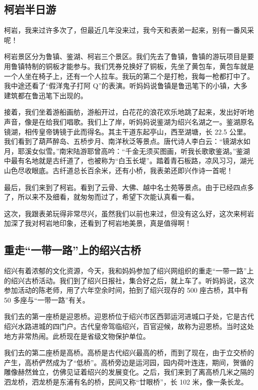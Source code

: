 \documentclass[UTF8,a4paper,titlepage,twoside,10.5pt]{article}
\begin{document}
\subsection{柯岩半日游}
\label{sec:org1535df1}

柯岩，我来过许多次了，但最近几年没来过，我今天和表弟一起来，别有一番风采呢！

柯岩景区分为鲁镇、鉴湖、柯岩三个景区。我们先去了鲁镇，鲁镇的游玩项目是要用鲁镇特制的铜板才能参与。我们凭券兑换好了铜板，先坐了黄包车，黄包车就是一个人坐在椅子上，还有一个人拉车。我玩的第二个是打枪，我每一枪都打中了。我中途还看了“假洋鬼子打阿 Q”的表演。听妈妈说鲁镇是鲁迅笔下的小镇，大多建筑都在鲁迅笔下出现的。

接着，我们坐着游船画舫，游船开过，白花花的浪花欢乐地跳了起来，发出好听地声音，像是在给我们唱歌。我们上了岸，听妈妈说鉴湖为绍兴名湖之一。鉴湖原名镜湖，相传皇帝铸镜于此而得名。其主干道东起亭山，西至湖塘，长 22.5 公里。我们看到了葫芦醉岛、五桥步月、南洋秋泛等景点。唐代诗人李白云：“镜湖水如月，耶溪女似雪。”南宋陆游耶曾高吟：“千金无须买图画，听我长歌歌鉴湖。”鉴湖中最有名地就是古纤道了，也被称为“白玉长堤”。踏着青石板路，凉风习习，湖光山色尽收眼底。古纤道总长百余米，还有小桥，我表弟还即兴作诗一首呢！

最后，我们来到了柯岩。看到了云骨、大佛、越中名士苑等景点。由于已经四点多了，所以来不及细看，就匆匆而过了，希望下次能认真看一看。

这次，我跟表弟玩得非常尽兴，虽然我们以前也来过，但没有这么好，这次来柯岩加深了我对柯岩地印象，还看到了柯岩地美景，真是值得啊！

\subsection{重走“一带一路”上的绍兴古桥}
\label{sec:org5c51001}

绍兴有着浓郁的文化资源，今天，我和妈妈参加了绍兴网组织的重走“一带一路”上的绍兴古桥活动。我们到了绍兴日报社，集合好之后，就上车了。听妈妈说，这次参加活动的陈老师，用了六年空余时间，拍到了绍兴现存的 500 座古桥，其中有 50 多座与“一带一路”有关。

我们去的第一座桥是迎恩桥。迎恩桥位于绍兴市区西郭运河进城口子处，它是古代绍兴水路进城的四门户。古代皇帝驾临绍兴，百官迎候，故称为迎恩桥。当时这处地方非常热闹。此桥现在是省级文物保护单位。

我们去的第二座桥是高桥。高桥是古代绍兴最高的桥，而到了现在，由于立交桥的产生，高桥俨然成为了“低桥”。高桥旁边是运河园，园内荷叶连连，期间，贺循的雕像赫然耸立，仿佛见证着绍兴的发展变化。之后，我们来到了离高桥几米之隔的泗龙桥，泗龙桥是东浦有名的桥，民间又称“廿眼桥”，长 102 米，像一条长龙。
\end{document}
